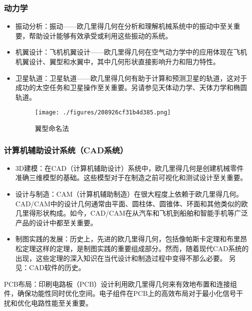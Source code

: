 \subsubsection{动力学}
\begin{itemize}
\item 振动分析：振动——欧几里得几何在分析和理解机械系统中的振动中至关重要，帮助设计能够有效承受或利用这些振动的系统。
\item 机翼设计：飞机机翼设计——欧几里得几何在空气动力学中的应用体现在飞机机翼设计、翼型和水翼中，其中几何形状直接影响升力和阻力特性。
\item 卫星轨道：卫星轨道——欧几里得几何有助于计算和预测卫星的轨道，这对于成功的太空任务和卫星操作至关重要。另请参见天体动力学、天体力学和椭圆轨道。
\begin{figure}[ht]
\centering
\texttt{[image: ./figures/208926cf31b4d385.png]}
\caption{翼型命名法} \label{fig_OJLJH_14}
\end{figure}
\end{itemize}
\subsubsection{计算机辅助设计系统（CAD系统）}
\begin{itemize}
\item 3D建模：在CAD（计算机辅助设计）系统中，欧几里得几何是创建机械零件准确三维模型的基础。这些模型对于在制造之前可视化和测试设计至关重要。  
\item 设计与制造：CAM（计算机辅助制造）在很大程度上依赖于欧几里得几何。CAD/CAM中的设计几何通常由平面、圆柱体、圆锥体、环面和其他类似的欧几里得形状构成。如今，CAD/CAM在从汽车和飞机到船舶和智能手机等广泛产品的设计中都至关重要。  
\item 制图实践的发展：历史上，先进的欧几里得几何，包括像帕斯卡定理和布里昂松定理这样的定理，是制图实践的重要组成部分。然而，随着现代CAD系统的出现，这些定理的深入知识在当代设计和制造过程中变得不那么必要。  
另见：CAD软件的历史。
\end{itemize}


PCB布局：印刷电路板（PCB）设计利用欧几里得几何来有效地布置和连接组件，确保功能性同时优化空间。电子组件在PCB上的高效布局对于最小化信号干扰和优化电路性能至关重要。
